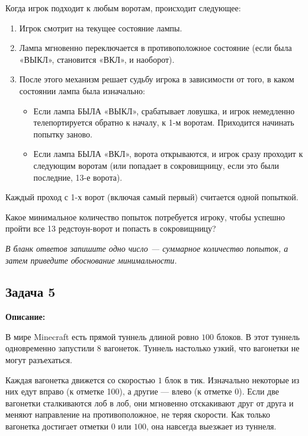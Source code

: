 \documentclass[12pt,a4paper]{article}
\begin{document}
Когда игрок подходит к любым воротам, происходит следующее:
\begin{enumerate}
    \item Игрок смотрит на текущее состояние лампы.
    \item Лампа мгновенно переключается в противоположное состояние (если была «ВЫКЛ», становится «ВКЛ», и наоборот).
    \item После этого механизм решает судьбу игрока в зависимости от того, в каком состоянии лампа была изначально:
    \begin{itemize}
        \item Если лампа БЫЛА «ВЫКЛ», срабатывает ловушка, и игрок немедленно телепортируется обратно к началу, к 1-м воротам. Приходится начинать попытку заново.
        \item Если лампа БЫЛА «ВКЛ», ворота открываются, и игрок сразу проходит к следующим воротам (или попадает в сокровищницу, если это были последние, 13-е ворота).
    \end{itemize}
\end{enumerate}

Каждый проход с 1-х ворот (включая самый первый) считается одной попыткой.

Какое минимальное количество попыток потребуется игроку, чтобы успешно пройти все 13 редстоун-ворот и попасть в сокровищницу?

\textit{В бланк ответов запишите одно число — суммарное количество попыток, а затем приведите обоснование минимальности.}

\newpage

\subsection*{Задача 5}

\textbf{Описание:}

В мире Minecraft есть прямой туннель длиной ровно $100$ блоков.
В этот туннель одновременно запустили $8$ вагонеток. Туннель настолько узкий, что вагонетки не могут разъехаться.

Каждая вагонетка движется со скоростью $1$ блок в тик. Изначально некоторые из них едут вправо (к отметке 100), а другие — влево (к отметке 0).
Если две вагонетки сталкиваются лоб в лоб, они мгновенно отскакивают друг от друга и меняют направление на противоположное, не теряя скорости.
Как только вагонетка достигает отметки $0$ или $100$, она навсегда выезжает из туннеля.
\end{document}
